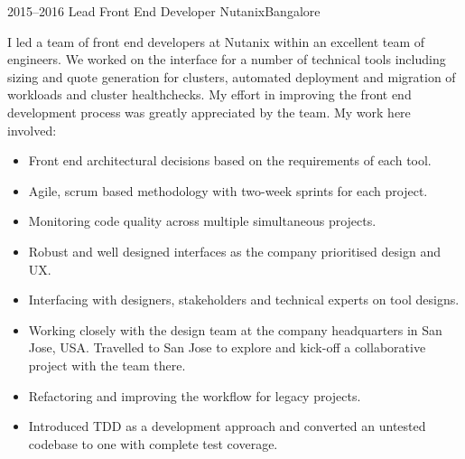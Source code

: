 \documentclass[10pt,a4paper,sans]{moderncv}        %
\begin{document}
\cventry
{\textcolor{light}{2015--2016}}
{Lead Front End Developer}
{}
{Nutanix}{Bangalore}
{I led a team of front end developers at Nutanix within an excellent team of engineers. We worked on the interface for a number of technical tools including sizing and quote generation for clusters, automated deployment and migration of workloads and cluster healthchecks. My effort in improving the front end development process was greatly appreciated by the team. My work here involved:
\vspace{6pt}
\begin{itemize}
  \item Front end architectural decisions based on the requirements of each tool.
  \item Agile, scrum based methodology with two-week sprints for each project.
  \item Monitoring code quality across multiple simultaneous projects.
  \item Robust and well designed interfaces as the company prioritised design and UX.
  \item Interfacing with designers, stakeholders and technical experts on tool designs.
\end{itemize}}

\vspace{6pt}

\cventry
{}
{}
{}
{}{}
{\begin{itemize}
  \item Working closely with the design team at the company headquarters in San Jose, USA. Travelled to San Jose to explore and kick-off a collaborative project with the team there.
  \item Refactoring and improving the workflow for legacy projects.
  \item Introduced TDD as a development approach and converted an untested codebase to one with complete test coverage.
\end{itemize}}

\vspace{8pt}
\end{document}
